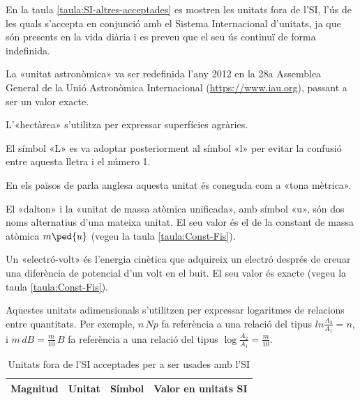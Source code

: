 En la taula \vref{taula:SI-altres-acceptades} es mostren les unitats fora de l'SI, l'ús de les quals s'accepta en conjunció amb el Sistema Internacional d'unitats, ja que són presents en la vida diària i es preveu que el seu ús continuï de forma indefinida. 

\begin{ThreePartTable}
\begin{TableNotes}
    \item[\color{blue}(a)] {\footnotesize La «unitat astronòmica» va ser redefinida l'any 2012 en la 28a Assemblea General de la Unió Astronòmica Internacional (\href{https://www.iau.org/}{https:/\!\!/www.iau.org}), passant a ser un valor exacte.}
    \item[\color{blue}(b)] {\footnotesize L'«hectàrea» s'utilitza per expressar superfícies agràries.}
    \item[\color{blue}(c)] {\footnotesize El símbol «L» es va adoptar posteriorment al símbol «l» per evitar la  confusió entre aquesta lletra  i  el número 1.}
    \item[\color{blue}(d)] {\footnotesize En els països de parla anglesa aquesta unitat és coneguda com a «tona mètrica».}
    \item[\color{blue}(e)] {\footnotesize El «dalton» i la «unitat de massa atòmica unificada», amb símbol «u»,  són dos noms alternatius d'una mateixa unitat. El seu valor és el de la constant de massa atòmica  $m\ped{u}$ (vegeu la taula \vref{taula:Const-Fis}).}
    \item[\color{blue}(f)] {\footnotesize Un «electró-volt» és l'energia cinètica que adquireix un electró després de creuar una diferència de potencial d'un volt en el buit. El seu valor és exacte (vegeu la taula \vref{taula:Const-Fis}).}
    \item[\color{blue}(g)] {\footnotesize Aquestes unitats adimensionals s'utilitzen per expressar logaritmes de relacions entre quantitats. Per exemple, $n\unit{\,Np}$ fa referència a una relació del tipus $ln\frac{A_2}{A_1}= n$, i  $ m\unit{\,dB} =\frac{m}{10}\unit{\,B}$  fa referència a una relació del tipus $\log\frac{A_2}{A_1} =\frac{m}{10}$.}
\end{TableNotes}
\begin{longtable}[h]{llcl}
   \caption{\label{taula:SI-altres-acceptades} Unitats fora de l'SI acceptades per a ser usades amb l'SI  }\\
   \toprule[1pt]
    Magnitud & Unitat &  Símbol & Valor en unitats SI\\
   \midrule
   \endfirsthead

\end{longtable}
\end{ThreePartTable}
